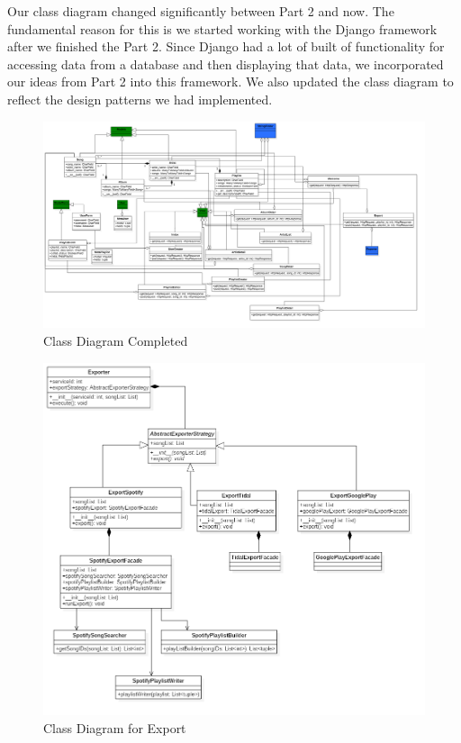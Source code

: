 \documentclass[12pt]{article}
\begin{document}
Our class diagram changed significantly between Part 2 and now. The fundamental reason for this is we started working with the Django framework after we finished the Part 2. Since Django had a lot of built of functionality for accessing data from a database and then displaying that data, we incorporated our ideas from Part 2 into this framework. We also updated the class diagram to reflect the design patterns we had implemented. 
\begin{figure}[H]
	\centering
	\includegraphics[scale=0.25]{DiagramAddedSearch.png}
	\caption{Class Diagram Completed}
	\label{fig:classDiagCompleted}
\end{figure}
\begin{figure}[H]
	\centering
	\includegraphics[scale=0.25]{ExportClassDiagram.png}
	\caption{Class Diagram for Export}
	\label{fig:classDiagExport}
\end{figure}
\end{document}

